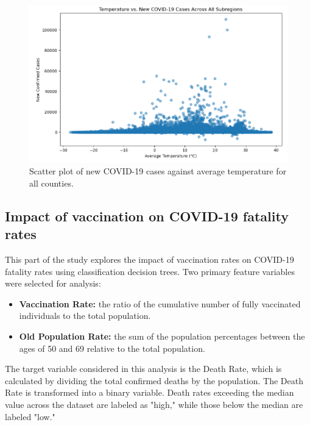 \documentclass[sigconf,screen,nonacm]{acmart}
\begin{document}
\begin{figure}[H]
  \centering
  \includegraphics[width=\linewidth]{Figures/Correlation-scatter.PNG}
  \caption{Scatter plot of new COVID-19 cases against average temperature for all counties.}
  \label{fig:scatter-cor}
\end{figure}



\subsection{Impact of vaccination on COVID-19 fatality rates}

This part of the study explores the impact of vaccination rates on COVID-19 fatality rates using classification decision trees. Two primary feature variables were selected for analysis:

\begin{itemize}
\item \textbf{Vaccination Rate:} the ratio of the cumulative number of fully vaccinated individuals to the total population.
\item \textbf{Old Population Rate:} the sum of the population percentages between the ages of 50 and 69 relative to the total population.
\end{itemize}

The target variable considered in this analysis is the Death Rate, which is calculated by dividing the total confirmed deaths by the population. The Death Rate is transformed into a binary variable. Death rates exceeding the median value across the dataset are labeled as "high," while those below the median are labeled "low."
\end{document}
